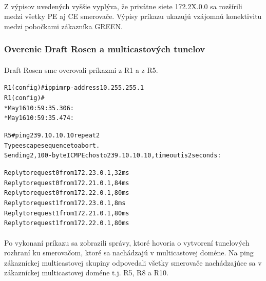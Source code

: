 \documentclass[12pt,twoside,a4paper]{report}
\begin{document}
\paragraph{}
Z výpisov uvedených vyššie vyplýva, že privátne siete 172.2X.0.0 sa rozšírili medzi všetky PE aj CE smerovače. Výpisy príkazu  ukazujú vzájomnú konektivitu medzi pobočkami zákazníka GREEN.

\subsubsection{Overenie Draft Rosen a multicastových tunelov}
\paragraph{}
Draft Rosen sme overovali príkazmi  z R1 a  z R5.

\noindent
{\selectfont
\begin{small}
\begin{alltt}
R1(config)#ip pim rp-address 10.255.255.1
R1(config)#
*May 16 10:59:35.306: %
*May 16 10:59:35.474: %

\end{alltt}
\end{small}
}

\noindent
{\selectfont
\begin{small}
\begin{alltt}
R5#ping 239.10.10.10 repeat 2 
Type escape sequence to abort.
Sending 2, 100-byte ICMP Echos to 239.10.10.10, timeout is 2 seconds:

Reply to request 0 from 172.23.0.1, 32 ms
Reply to request 0 from 172.21.0.1, 84 ms
Reply to request 0 from 172.22.0.1, 80 ms
Reply to request 1 from 172.23.0.1, 8 ms
Reply to request 1 from 172.21.0.1, 80 ms
Reply to request 1 from 172.22.0.1, 80 ms
\end{alltt}
\end{small}
}

\paragraph{}
Po vykonaní príkazu  sa zobrazili správy, ktoré hovoria o vytvorení tunelových rozhraní ku smerovačom, ktoré sa nachádzajú v multicastovej doméne. Na ping zákazníckej multicastovej skupiny odpovedali všetky smerovače nachádzajúce sa v zákazníckej multicastovej doméne t.j. R5, R8 a R10.
\end{document}
